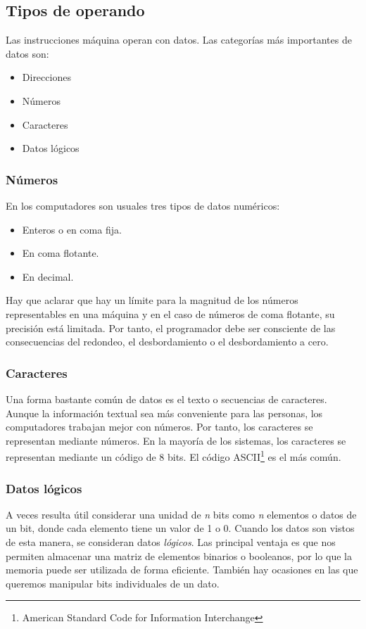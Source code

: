 \subsection{Tipos de operando}

Las instrucciones máquina operan con datos. Las categorías más importantes de datos son:

\begin{itemize}
  \item Direcciones
  \item Números 
  \item Caracteres
  \item Datos lógicos
\end{itemize}

\begin{subs}
  \subsubsection{Números}

  En los computadores son usuales tres tipos de datos numéricos:

  \begin{itemize}
    \item Enteros o en coma fija.
    \item En coma flotante.
    \item En decimal.
  \end{itemize}

  Hay que aclarar que hay un límite para la magnitud de los números representables en una máquina y en el caso de números de coma flotante, su precisión está limitada. Por tanto, el programador debe ser consciente de las consecuencias del redondeo, el desbordamiento o el desbordamiento a cero.

  \subsubsection{Caracteres}

  Una forma bastante común de datos es el texto o secuencias de caracteres. Aunque la información textual sea más conveniente para las personas, los computadores trabajan mejor con números. Por tanto, los caracteres se representan mediante números. En la mayoría de los sistemas, los caracteres se representan mediante un código de 8 bits. El código ASCII\footnote{American Standard Code for Information Interchange} es el más común.

  \subsubsection{Datos lógicos}

  A veces resulta útil considerar una unidad de \textit{n} bits como \textit{n} elementos o datos de un bit, donde cada elemento tiene un valor de 1 o 0. Cuando los datos son vistos de esta manera, se consideran datos \textit{lógicos}.
  Las principal ventaja es que nos permiten almacenar una matriz de elementos binarios o booleanos, por lo que la memoria puede ser utilizada de forma eficiente. También hay ocasiones en las que queremos manipular bits individuales de un dato.
\end{subs}

